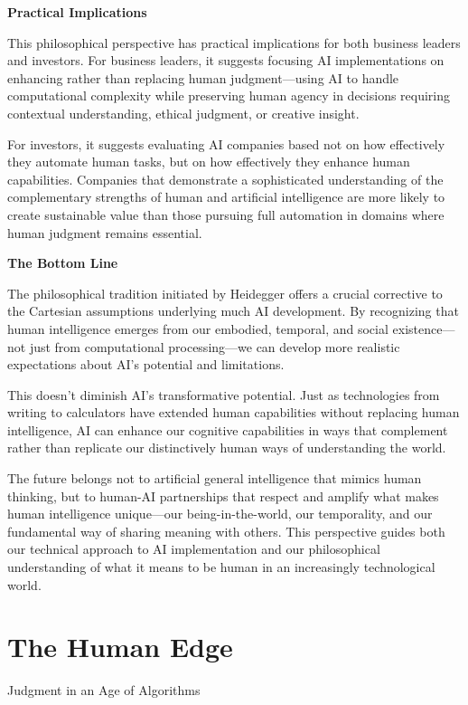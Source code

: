 \documentclass[
  Letterpaper,
]{scrbook}
\begin{document}
\textbf{Practical Implications}

This philosophical perspective has practical implications for both
business leaders and investors. For business leaders, it suggests
focusing AI implementations on enhancing rather than replacing human
judgment---using AI to handle computational complexity while preserving
human agency in decisions requiring contextual understanding, ethical
judgment, or creative insight.

For investors, it suggests evaluating AI companies based not on how
effectively they automate human tasks, but on how effectively they
enhance human capabilities. Companies that demonstrate a sophisticated
understanding of the complementary strengths of human and artificial
intelligence are more likely to create sustainable value than those
pursuing full automation in domains where human judgment remains
essential.

\textbf{The Bottom Line}

The philosophical tradition initiated by Heidegger offers a crucial
corrective to the Cartesian assumptions underlying much AI development.
By recognizing that human intelligence emerges from our embodied,
temporal, and social existence---not just from computational
processing---we can develop more realistic expectations about AI's
potential and limitations.

This doesn't diminish AI's transformative potential. Just as
technologies from writing to calculators have extended human
capabilities without replacing human intelligence, AI can enhance our
cognitive capabilities in ways that complement rather than replicate our
distinctively human ways of understanding the world.

The future belongs not to artificial general intelligence that mimics
human thinking, but to human-AI partnerships that respect and amplify
what makes human intelligence unique---our being-in-the-world, our
temporality, and our fundamental way of sharing meaning with others.
This perspective guides both our technical approach to AI implementation
and our philosophical understanding of what it means to be human in an
increasingly technological world.


\chapter{The Human Edge}\label{the-human-edge}

Judgment in an Age of Algorithms
\end{document}
